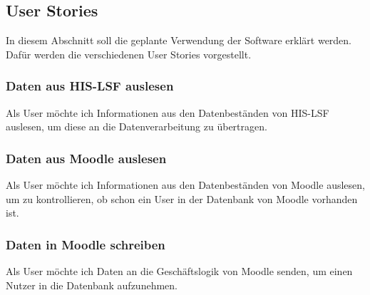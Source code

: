 \subsection{User Stories}
\label{sec:Usecases}
\begin{flushleft}
In diesem Abschnitt soll die geplante Verwendung der Software erklärt werden.
Dafür werden die verschiedenen User Stories vorgestellt.



\subsubsection{Daten aus HIS-LSF auslesen} %
\label{ssub:Daten aus HIS-LSF auslesen}
Als User möchte ich Informationen aus den Datenbeständen von \acs{HIS}-\acs{LSF} auslesen, um diese an die Datenverarbeitung zu übertragen.

\subsubsection{Daten aus Moodle auslesen}
\label{ssub:Daten aus Moodle auslesen}
Als User möchte ich Informationen aus den Datenbeständen von \acs{Moodle} auslesen, um zu kontrollieren, ob schon ein User in der Datenbank von \acs{Moodle} vorhanden ist.

\subsubsection{Daten in Moodle schreiben}
\label{ssub:Daten in Moodle schreiben}
Als User möchte ich Daten an die Geschäftslogik von \acs{Moodle} senden, um einen Nutzer in die Datenbank aufzunehmen. 


\end{flushleft}
